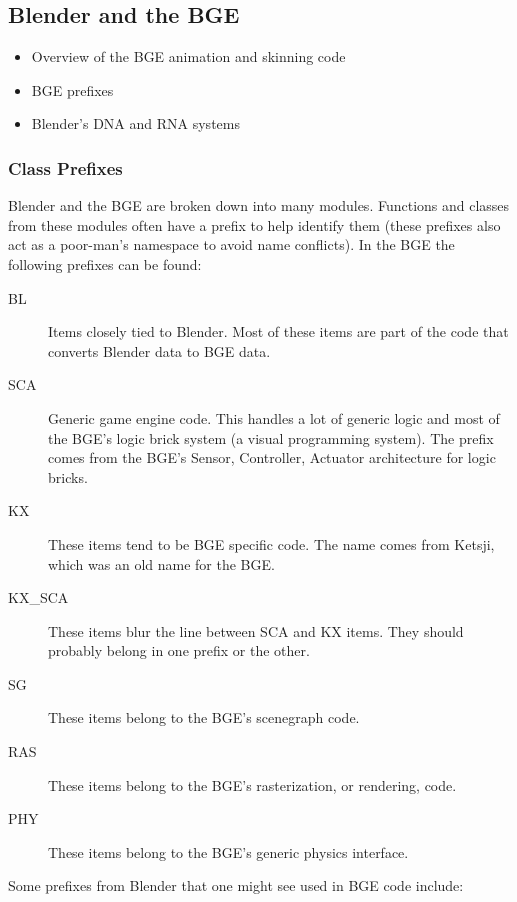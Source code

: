 \subsection{Blender and the BGE}
\ifsummaries
\begin{itemize}
 \item Overview of the BGE animation and skinning code
 \item BGE prefixes
 \item Blender's DNA and RNA systems
\end{itemize}
\fi

\subsubsection{Class Prefixes}
Blender and the BGE are broken down into many modules.
Functions and classes from these modules often have a prefix to help identify them (these prefixes also act as a poor-man's namespace to avoid name conflicts).
In the BGE the following prefixes can be found:

\begin{description}
 \item[BL] Items closely tied to Blender. Most of these items are part of the code that converts Blender data to BGE data.
 \item[SCA] Generic game engine code. This handles a lot of generic logic and most of the BGE's logic brick system (a visual programming system). The prefix comes from the BGE's Sensor, Controller, Actuator architecture for logic bricks.
 \item [KX] These items tend to be BGE specific code. The name comes from Ketsji, which was an old name for the BGE.
 \item [KX\_SCA] These items blur the line between SCA and KX items. They should probably belong in one prefix or the other.
 \item [SG] These items belong to the BGE's scenegraph code.
 \item [RAS] These items belong to the BGE's rasterization, or rendering, code.
 \item [PHY] These items belong to the BGE's generic physics interface.
\end{description}

Some prefixes from Blender that one might see used in BGE code include:

